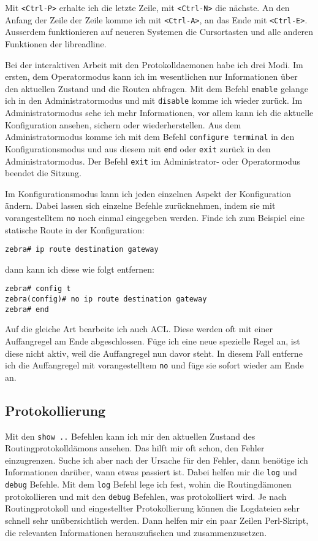 \begin{normaltext}
  Mit \verb?<Ctrl-P>? erhalte ich die letzte Zeile, mit \verb?<Ctrl-N>? die
  nächste. An den Anfang der Zeile der Zeile komme ich mit \verb?<Ctrl-A>?, an
  das Ende mit \verb?<Ctrl-E>?. Ausserdem funktionieren auf neueren Systemen
  die Cursortasten und alle anderen Funktionen der libreadline.

  Bei der interaktiven Arbeit mit den Protokolldaemonen habe ich drei Modi. Im
  ersten, dem Operatormodus kann ich im wesentlichen nur Informationen über
  den aktuellen Zustand und die Routen abfragen. Mit dem Befehl \verb?enable?
  gelange ich in den Administratormodus und mit \verb?disable? komme ich
  wieder zurück.
  Im Administratormodus sehe ich mehr Informationen, vor allem kann ich die
  aktuelle Konfiguration ansehen, sichern oder wiederherstellen.
  Aus dem Administratormodus komme ich mit dem Befehl \verb?configure terminal?
  in den Konfigurationsmodus und aus diesem mit \verb?end? oder \verb?exit?
  zurück in den Administratormodus.
  Der Befehl \verb?exit? im Administrator- oder Operatormodus beendet die
  Sitzung.

  Im Konfigurationsmodus kann ich jeden einzelnen Aspekt der Konfiguration
  ändern. Dabei lassen sich einzelne Befehle zurücknehmen, indem sie mit
  vorangestelltem \verb?no? noch einmal eingegeben werden. Finde ich zum
  Beispiel eine statische Route in der Konfiguration:
  \begin{verbatim}
zebra# ip route destination gateway
  \end{verbatim}
  dann kann ich diese wie folgt entfernen:
  \begin{verbatim}
zebra# config t
zebra(config)# no ip route destination gateway
zebra# end
  \end{verbatim}

  Auf die gleiche Art bearbeite ich auch ACL. Diese werden oft mit einer
  Auffangregel am Ende abgeschlossen. Füge ich eine neue spezielle Regel an,
  ist diese nicht aktiv, weil die Auffangregel nun davor steht. In diesem Fall
  entferne ich die Auffangregel mit vorangestelltem \verb?no? und füge sie
  sofort wieder am Ende an.

  \subsection*{Protokollierung}
  Mit den \verb?show ..? Befehlen kann ich mir den aktuellen Zustand des
  Routingprotokolldämons ansehen. Das hilft mir oft schon, den Fehler
  einzugrenzen. Suche ich aber nach der Ursache für den Fehler, dann benötige
  ich Informationen darüber, wann etwas passiert ist. Dabei helfen mir die
  \verb?log? und \verb?debug? Befehle. Mit dem \verb?log? Befehl lege ich
  fest, wohin die Routingdämonen protokollieren und mit den \verb?debug?
  Befehlen, was protokolliert wird. Je nach Routingprotokoll und eingestellter
  Protokollierung können die Logdateien sehr schnell sehr unübersichtlich
  werden. Dann helfen mir ein paar Zeilen Perl-Skript, die relevanten
  Informationen herauszufischen und zusammenzusetzen.
\end{normaltext}

